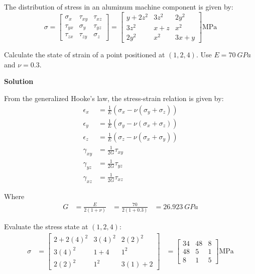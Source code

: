\section{}The distribution of stress in an aluminum machine component is given by:
\[
\sigma = 
\begin{bmatrix}
    \sigma_x & \tau_{xy} & \tau_{xz} \\
    \tau_{yx} & \sigma_y & \tau_{yz} \\
    \tau_{zx} & \tau_{zy} & \sigma_z
\end{bmatrix}
=
\begin{bmatrix}
    y + 2z^2 & 3z^2 & 2y^2 \\
    3z^2 & x + z & x^2 \\
    2y^2 & x^2 & 3x + y
\end{bmatrix}
\si{\mega\pascal}
\]

Calculate the state of strain of a point positioned at $(1, 2, 4)$. Use $E = \qty{70}{GPa}$ and $\nu = 0.3$.

\textbf{Solution}

From the generalized Hooke's law, the stress-strain relation is given by:
\[
\begin{aligned}
    \epsilon_x &= \frac{1}{E} (\sigma_x - \nu(\sigma_y + \sigma_z)) \\
    \epsilon_y &= \frac{1}{E} (\sigma_y - \nu(\sigma_x + \sigma_z)) \\
    \epsilon_z &= \frac{1}{E} (\sigma_z - \nu(\sigma_x + \sigma_y)) \\
    \gamma_{xy} &= \frac{1}{2G} \tau_{xy} \\
    \gamma_{yz} &= \frac{1}{2G} \tau_{yz} \\
    \gamma_{xz} &= \frac{1}{2G} \tau_{xz}
\end{aligned}
\]

Where 
\[
\begin{aligned}
    G &= \frac{E}{2(1 + \nu)}
    &= \frac{70}{2(1 + 0.3)}
    &= \qty{26.923}{GPa}
\end{aligned}
\]

Evaluate the stress state at $(1, 2, 4)$:
\[
\begin{aligned}
    \sigma &= 
    \begin{bmatrix}
        2 + 2(4)^2 & 3(4)^2 & 2(2)^2 \\
        3(4)^2 & 1 + 4 & 1^2 \\
        2(2)^2 & 1^2 & 3(1) + 2
    \end{bmatrix}
    &=
    \begin{bmatrix}
        34 & 48 & 8 \\
        48 & 5 & 1 \\
        8 & 1 & 5
    \end{bmatrix}
    \si{\mega\pascal}
\end{aligned}
\]


